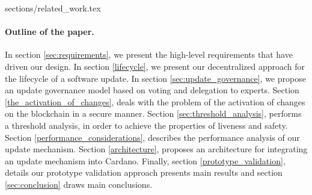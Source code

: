 {sections/related_work.tex}

\paragraph{Outline of the paper.}
In section \ref{sec:requirements}, we present the high-level requirements that
have driven our design. In section \ref{lifecycle}, we present our
decentralized approach for the lifecycle of a software update. In section
\ref{sec:update_governance}, we propose an update governance model based on
voting and delegation to experts. Section \ref{the_activation_of_changes},
deals
with the problem of the activation of changes on the blockchain in a secure
manner. Section \ref{sec:threshold_analysis}, performs a threshold analysis, in
order to achieve the properties of liveness and safety. Section
\ref{performance_considerations}, describes the performance analysis of our
update mechanism. Section \ref{architecture}, proposes an architecture for
integrating an update mechanism into Cardano. Finally, section
\ref{prototype_validation}, details our prototype validation approach presents
main results and
section \ref{sec:conclusion} draws main conclusions.
